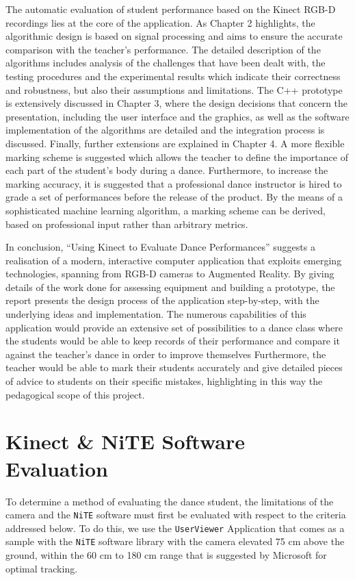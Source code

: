 \documentclass[11pt,a4paper]{article}
\begin{document}
\noindent
The automatic evaluation of student performance based on the Kinect RGB-D recordings lies at the core of the application. As Chapter 2 highlights, the algorithmic design is based on signal processing and aims to ensure the accurate comparison with the teacher’s performance. The detailed description of the algorithms includes analysis of the challenges that have been dealt with, the testing procedures and the experimental results which indicate their correctness and robustness, but also their assumptions and limitations. The C++ prototype is extensively discussed in Chapter 3, where the design decisions that concern the presentation, including the user interface and the graphics, as well as the software implementation of the algorithms are detailed and the integration process is discussed. Finally, further extensions are explained in Chapter 4. A more flexible marking scheme is suggested which allows the teacher to define the importance of each part of the student’s body during a dance. Furthermore, to increase the marking accuracy, it is suggested that a professional dance instructor is hired to grade a set of performances before the release of the product. By the means of a sophisticated machine learning algorithm, a marking scheme can be derived, based on professional input rather than arbitrary metrics.

\noindent
In conclusion, “Using Kinect to Evaluate Dance Performances” suggests a realisation of a modern, interactive computer application that exploits emerging technologies, spanning from RGB-D cameras to Augmented Reality. By giving details of the work done for assessing equipment and building a prototype, the report presents the design process of the application step-by-step, with the underlying ideas and implementation. The numerous capabilities of this application would provide an extensive set of possibilities to a dance class where the students would be able to keep records of their performance and compare it against the teacher’s dance in order to improve themselves Furthermore, the teacher would be able to mark their students accurately and give detailed pieces of advice to students on their specific mistakes, highlighting in this way the pedagogical scope of this project.

\clearpage

\setcounter{page}{1}
\section{Kinect \& NiTE Software Evaluation}
\noindent
To determine a method of evaluating the dance student, the limitations of the camera and the \texttt{NiTE} software must first be evaluated with respect to the criteria addressed below. To do this, we use the \texttt{UserViewer} Application that comes as a sample with the \texttt{NiTE} software library with the camera elevated 75 cm above the ground, within the 60 cm to 180 cm range that is suggested by Microsoft for optimal tracking. 
\end{document}
